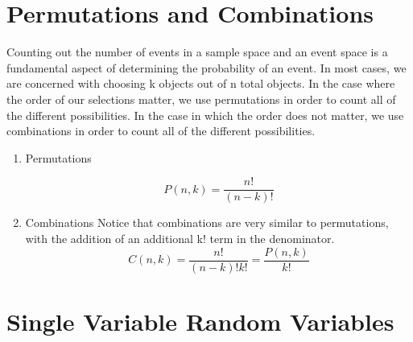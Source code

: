 \documentclass{article}
\begin{document}
\section{Permutations and Combinations}
Counting out the number of events in a sample space and an event space is a fundamental aspect of determining the probability of an event. In most cases, we are concerned with choosing k objects out of n total objects. In the case where the order of our selections matter, we use permutations in order to count all of the different possibilities. In the case in which the order does not matter, we use combinations in order to count all of the different possibilities.
\begin{enumerate}
    \item Permutations

    $$P(n, k) = \frac{n!}{(n - k)!}$$
    
    \item Combinations
    Notice that combinations are very similar to permutations, with the addition of an additional k! term in the denominator. 
    $$C(n, k) = \frac{n!}{(n-k)!k!} = \frac{P(n,k)}{k!}$$
\end{enumerate}

\section{Single Variable Random Variables}
\end{document}
